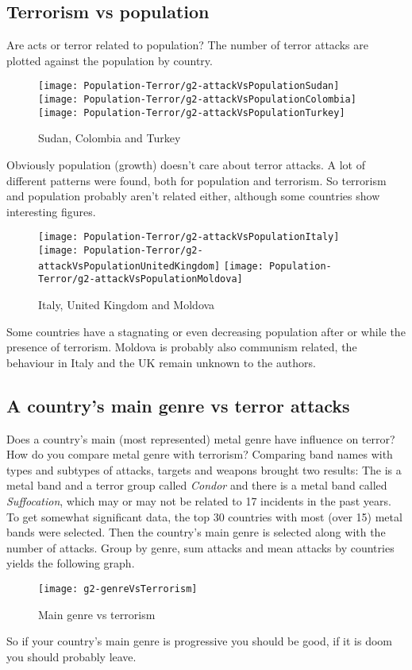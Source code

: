 \subsection{Terrorism vs population}
Are acts or terror related to population? The number of terror attacks are plotted against the population by country.
\begin{figure}[hbt!]
	\texttt{[image: Population-Terror/g2-attackVsPopulationSudan]}
	\centering
	\texttt{[image: Population-Terror/g2-attackVsPopulationColombia]}
	\texttt{[image: Population-Terror/g2-attackVsPopulationTurkey]}
	\caption{Sudan, Colombia and Turkey}
\end{figure}
Obviously population (growth) doesn't care about terror attacks. A lot of different patterns were found, both for population and terrorism. So terrorism and population probably aren't related either, although some countries show interesting figures.
\begin{figure}[hbt!]
	\texttt{[image: Population-Terror/g2-attackVsPopulationItaly]}
	\centering
	\texttt{[image: Population-Terror/g2-attackVsPopulationUnitedKingdom]}
	\texttt{[image: Population-Terror/g2-attackVsPopulationMoldova]}
	\caption{Italy, United Kingdom and Moldova}
\end{figure}
Some countries have a stagnating or even decreasing population after or while the presence of terrorism. Moldova is probably also communism related, the behaviour in Italy and the UK remain unknown to the authors.


\subsection{A country's main genre vs terror attacks}
Does a country's main (most represented) metal genre have influence on terror?
How do you compare metal genre with terrorism? Comparing band names with types and subtypes of attacks, targets and weapons brought two results: The is a metal band and a terror group called \emph{Condor} and there is a metal band called \emph{Suffocation}, which may or may not be related to 17 incidents in the past years. To get somewhat significant data, the top 30 countries with most (over 15) metal bands were selected. Then the country's main genre is selected along with the number of attacks. Group by genre, sum attacks and mean attacks by countries yields the following graph.
\begin{figure}[hbt!]
	\centering
	\texttt{[image: g2-genreVsTerrorism]}
	\caption{Main genre vs terrorism}
\end{figure}
So if your country's main genre is progressive you should be good, if it is doom you should probably leave.


